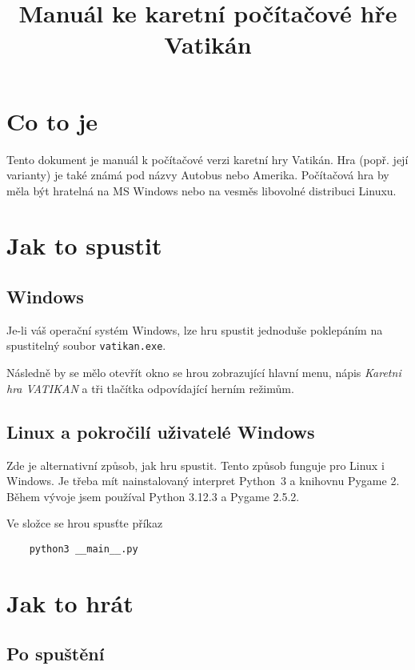 \documentclass{article}
\title{Manuál ke karetní počítačové hře Vatikán}
\begin{document}
\maketitle

\section*{Co to je}

Tento dokument je manuál k počítačové verzi karetní hry Vatikán. Hra (popř.
její varianty) je také známá pod názvy Autobus nebo Amerika. Počítačová hra by
měla být hratelná na MS Windows nebo na vesměs libovolné distribuci Linuxu.

\section*{Jak to spustit}

\subsection*{Windows}

Je-li váš operační systém Windows, lze hru spustit jednoduše poklepáním na
spustitelný soubor \texttt{vatikan.exe}.

Následně by se mělo otevřít okno se hrou zobrazující hlavní menu, nápis
\emph{Karetni hra VATIKAN} a tři tlačítka odpovídající herním režimům.

\subsection*{Linux a pokročilí uživatelé Windows}

Zde je alternativní způsob, jak hru spustit. Tento způsob funguje pro Linux i
Windows. Je třeba mít nainstalovaný interpret Python~3 a knihovnu Pygame 2.
Během vývoje jsem používal Python 3.12.3 a Pygame 2.5.2.

Ve složce se hrou spusťte příkaz

\begin{verbatim}
	python3 __main__.py
\end{verbatim}

\section*{Jak to hrát}

\subsection*{Po spuštění}
\end{document}
